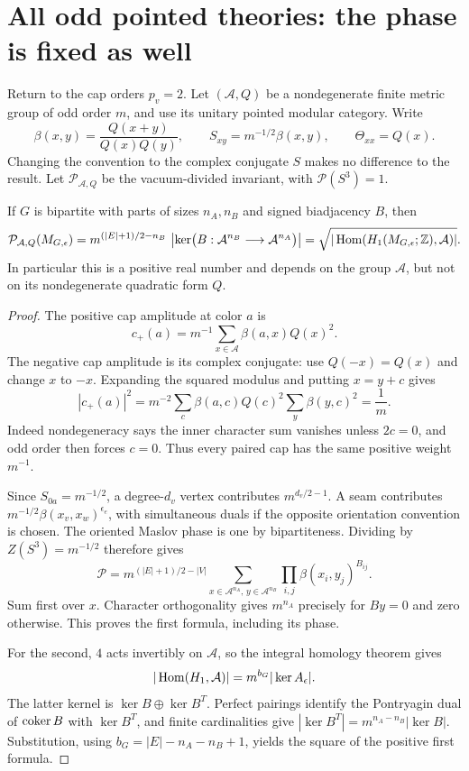 \section{All odd pointed theories: the phase is fixed as well}
Return to the cap orders \(p_v=2\). Let \((\mathcal A,Q)\) be a
nondegenerate finite metric group of odd order \(m\), and use its unitary
pointed modular category. Write
\[
 \beta(x,y)=\frac{Q(x+y)}{Q(x)Q(y)},\qquad
 S_{xy}=m^{-1/2}\beta(x,y),\qquad \Theta_{xx}=Q(x).
\]
Changing the convention to the complex conjugate \(S\) makes no
difference to the result. Let \(\mathcal P_{\mathcal A,Q}\) be the
vacuum-divided invariant, with \(\mathcal P(S^3)=1\).

\begin{theorem}
If \(G\) is bipartite with parts of sizes \(n_A,n_B\) and signed
biadjacency \(B\), then
\[
 \mathcal P_{\mathcal A,Q}(M_{G,\epsilon})
 =m^{(|E|+1)/2-n_B}\,
 \left|\ker\bigl(B:\mathcal A^{n_B}\longrightarrow
                         \mathcal A^{n_A}\bigr)\right|
 =\sqrt{|\operatorname{Hom}(H_1(M_{G,\epsilon};\mathbb Z),\mathcal A)|}.
\]
In particular this is a positive real number and depends on the group
\(\mathcal A\), but not on its nondegenerate quadratic form \(Q\).
\end{theorem}
\begin{proof}
The positive cap amplitude at color \(a\) is
\[
 c_+(a)=m^{-1}\sum_{x\in\mathcal A}\beta(a,x)Q(x)^2.
\]
The negative cap amplitude is its complex conjugate: use
\(Q(-x)=Q(x)\) and change \(x\) to \(-x\). Expanding the squared
modulus and putting \(x=y+c\) gives
\[
 |c_+(a)|^2=m^{-2}\sum_c\beta(a,c)Q(c)^2
                    \sum_y\beta(y,c)^2=\frac1m.
\]
Indeed nondegeneracy says the inner character sum vanishes unless
\(2c=0\), and odd order then forces \(c=0\). Thus every paired cap
has the same positive weight \(m^{-1}\).

Since \(S_{0a}=m^{-1/2}\), a degree-\(d_v\) vertex contributes
\(m^{d_v/2-1}\). A seam contributes
\(m^{-1/2}\beta(x_v,x_w)^{\epsilon_e}\), with simultaneous duals
if the opposite orientation convention is chosen. The oriented Maslov
phase is one by bipartiteness. Dividing by \(Z(S^3)=m^{-1/2}\)
therefore gives
\[
 \mathcal P=m^{(|E|+1)/2-|V|}
 \sum_{x\in\mathcal A^{n_A},\,y\in\mathcal A^{n_B}}
       \prod_{i,j}\beta(x_i,y_j)^{B_{ij}}.
\]
Sum first over \(x\). Character orthogonality gives \(m^{n_A}\)
precisely for \(By=0\) and zero otherwise. This proves the first
formula, including its phase.

For the second, \(4\) acts invertibly on \(\mathcal A\), so the
integral homology theorem gives
\[
 |\operatorname{Hom}(H_1,\mathcal A)|
 =m^{b_G}|\ker A_\epsilon|.
\]
The latter kernel is \(\ker B\oplus\ker B^T\). Perfect pairings
identify the Pontryagin dual of \(\operatorname{coker} B\) with \(\ker B^T\),
and finite cardinalities give
\(|\ker B^T|=m^{n_A-n_B}|\ker B|\).
Substitution, using \(b_G=|E|-n_A-n_B+1\), yields the square of
the positive first formula.
\end{proof}

